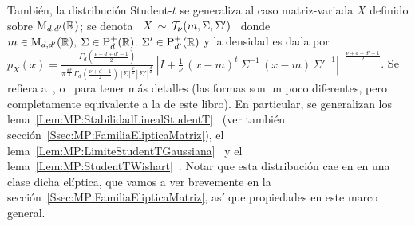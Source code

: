 Tambi\'en, la  distribuci\'on Student-$t$  se generaliza al  caso matriz-variada
$X$  definido   sobre  $\mathrm{M}_{d,d'}(\mathbb{R})$;   se  denota  \   $X  \,   \sim  \,
\mathcal{T}_\nu(m,\Sigma,\Sigma')$  \ donde \  $m \in  \mathrm{M}_{d,d'}(\mathbb{R}), \:  \Sigma \in
\mathrm{P}_d^+(\mathbb{R}), \:  \Sigma' \in \mathrm{P}_{d'}^+(\mathbb{R})$  y la densidad es  dada por
$\displaystyle             p_X(x)             =             \frac{\Gamma_d\left(
    \frac{\nu+d+d'-1}{2}\right)}{\pi^{\frac{d       d'}{2}}       \Gamma_d\left(
    \frac{\nu+d-1}{2}\right)  \,  \left|  \Sigma  \right|^{\frac{d'}{2}}  \left|
    \Sigma'  \right|^{\frac{d}{2}}} \:  \left| I  + \frac{1}{\nu}  \,  (x-m)^t \
  \Sigma^{-1}  \, (x-m) \,  \Sigma'^{-1} \right|^{-  \frac{\nu+d+d'-1}{2}}$.  Se
refiera a~\cite{Dic67}, \cite[Cap.~4]{GupNag99} o~\cite[\S5.11 y ref.]{KotNad04}
para tener m\'as detalles (las formas son un poco diferentes, pero completamente
equivalente  a   la  de  este   libro).   En  particular,  se   generalizan  los
lema~\ref{Lem:MP:StabilidadLinealStudentT}~\cite[Teo.~4.3.5]{GupNag99}       (ver
tambi\'en           secci\'on~\ref{Ssec:MP:FamiliaElipticaMatriz}),           el
lema~\ref{Lem:MP:LimiteStudentTGaussiana}~\cite[Teo.~4.3.4]{GupNag99}    y    el
lema~\ref{Lem:MP:StudentTWishart}~\cite[Teo.~4.2.1]{GupNag99}.  Notar  que  esta
distribuci\'on cae en en una clase  dicha el\'iptica, que vamos a ver brevemente
en  la secci\'on~\ref{Ssec:MP:FamiliaElipticaMatriz},  as\'i que  propiedades en
este marco general.
